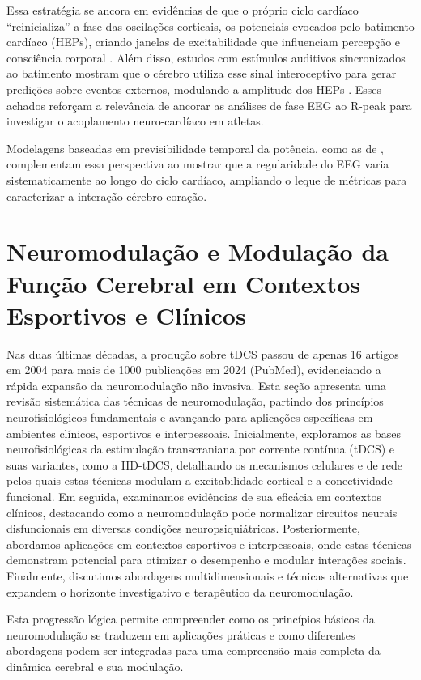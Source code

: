 Essa estratégia se ancora em evidências de que o próprio ciclo cardíaco ``reinicializa'' a fase das oscilações corticais, os potenciais evocados pelo batimento cardíaco (HEPs), criando janelas de excitabilidade que influenciam percepção e consciência corporal \cite{park2018neural}. Além disso, estudos com estímulos auditivos sincronizados ao batimento mostram que o cérebro utiliza esse sinal interoceptivo para gerar predições sobre eventos externos, modulando a amplitude dos HEPs 
\cite{banelli2020skipping}. Esses achados reforçam a relevância de ancorar as análises de fase EEG ao R-peak para investigar o acoplamento neuro-cardíaco em atletas.

Modelagens baseadas em previsibilidade temporal da potência, como as de , complementam essa perspectiva ao mostrar que a regularidade do EEG varia sistematicamente ao longo do ciclo cardíaco, ampliando o leque de métricas para caracterizar a interação cérebro-coração.

\section{Neuromodulação e Modulação da Função Cerebral em Contextos Esportivos e Clínicos}
Nas duas últimas décadas, a produção sobre tDCS passou de apenas 16 artigos em 2004 para mais de 1000 publicações em 2024 (PubMed), evidenciando a rápida expansão da neuromodulação não invasiva. Esta seção apresenta uma revisão sistemática das técnicas de neuromodulação, partindo dos princípios neurofisiológicos fundamentais e avançando para aplicações específicas em ambientes clínicos, esportivos e interpessoais. Inicialmente, exploramos as bases neurofisiológicas da estimulação transcraniana por corrente contínua (tDCS) e suas variantes, como a HD-tDCS, detalhando os mecanismos celulares e de rede pelos quais estas técnicas modulam a excitabilidade cortical e a conectividade funcional. Em seguida, examinamos evidências de sua eficácia em contextos clínicos, destacando como a neuromodulação pode normalizar circuitos neurais disfuncionais em diversas condições neuropsiquiátricas. Posteriormente, abordamos aplicações em contextos esportivos e interpessoais, onde estas técnicas demonstram potencial para otimizar o desempenho e modular interações sociais. Finalmente, discutimos abordagens multidimensionais e técnicas alternativas que expandem o horizonte investigativo e terapêutico da neuromodulação. 

Esta progressão lógica permite compreender como os princípios básicos da neuromodulação se traduzem em aplicações práticas e como diferentes abordagens podem ser integradas para uma compreensão mais completa da dinâmica cerebral e sua modulação.

